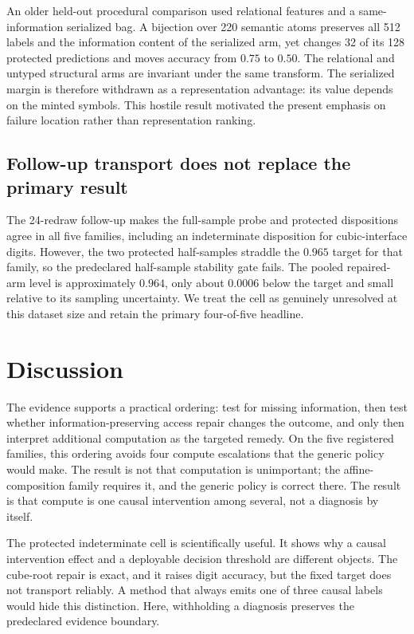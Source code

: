 \documentclass[10pt]{article}
\begin{document}
An older held-out procedural comparison used relational features and a same-information serialized bag. A bijection over 220 semantic atoms preserves all 512 labels and the information content of the serialized arm, yet changes 32 of its 128 protected predictions and moves accuracy from $0.75$ to $0.50$. The relational and untyped structural arms are invariant under the same transform. The serialized margin is therefore withdrawn as a representation advantage: its value depends on the minted symbols. This hostile result motivated the present emphasis on failure location rather than representation ranking.

\subsection{Follow-up transport does not replace the primary result}

The 24-redraw follow-up makes the full-sample probe and protected dispositions agree in all five families, including an indeterminate disposition for cubic-interface digits. However, the two protected half-samples straddle the $0.965$ target for that family, so the predeclared half-sample stability gate fails. The pooled repaired-arm level is approximately $0.964$, only about $0.0006$ below the target and small relative to its sampling uncertainty. We treat the cell as genuinely unresolved at this dataset size and retain the primary four-of-five headline.

\section{Discussion}

The evidence supports a practical ordering: test for missing information, then test whether information-preserving access repair changes the outcome, and only then interpret additional computation as the targeted remedy. On the five registered families, this ordering avoids four compute escalations that the generic policy would make. The result is not that computation is unimportant; the affine-composition family requires it, and the generic policy is correct there. The result is that compute is one causal intervention among several, not a diagnosis by itself.

The protected indeterminate cell is scientifically useful. It shows why a causal intervention effect and a deployable decision threshold are different objects. The cube-root repair is exact, and it raises digit accuracy, but the fixed target does not transport reliably. A method that always emits one of three causal labels would hide this distinction. Here, withholding a diagnosis preserves the predeclared evidence boundary.
\end{document}
